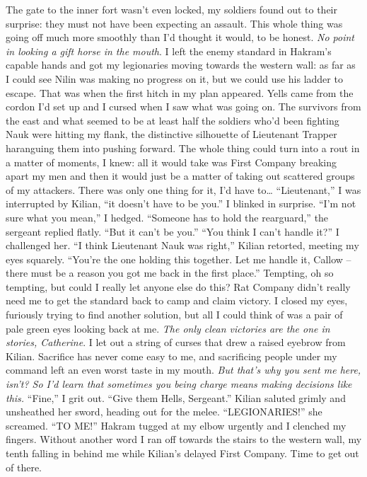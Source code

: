 \documentclass[12pt, openany]{book}
\begin{document}
The gate to the inner fort wasn’t even locked, my soldiers found out to their surprise: they must not have been expecting an assault. This whole thing was going off much more smoothly than I’d thought it would, to be honest. \textit{No point in looking a gift horse in the mouth}. I left the enemy standard in Hakram’s capable hands and got my legionaries moving towards the western wall: as far as I could see Nilin was making no progress on it, but we could use his ladder to escape. That was when the first hitch in my plan appeared. Yells came from the cordon I’d set up and I cursed when I saw what was going on. The survivors from the east and what seemed to be at least half the soldiers who’d been fighting Nauk were hitting my flank, the distinctive silhouette of Lieutenant Trapper haranguing them into pushing forward. The whole thing could turn into a rout in a matter of moments, I knew: all it would take was First Company breaking apart my men and then it would just be a matter of taking out scattered groups of my attackers. There was only one thing for it, I’d have to…
“Lieutenant,” I was interrupted by Kilian, “it doesn’t have to be you.”
I blinked in surprise.
“I’m not sure what you mean,” I hedged.
“Someone has to hold the rearguard,” the sergeant replied flatly. “But it can’t be you.”
“You think I can’t handle it?” I challenged her.
“I think Lieutenant Nauk was right,” Kilian retorted, meeting my eyes squarely. “You’re the one holding this together. Let me handle it, Callow – there must be a reason you got me back in the first place.”
Tempting, oh so tempting, but could I really let anyone else do this? Rat Company didn’t really need me to get the standard back to camp and claim victory. I closed my eyes, furiously trying to find another solution, but all I could think of was a pair of pale green eyes looking back at me. \textit{The only clean victories are the one in stories, Catherine}. I let out a string of curses that drew a raised eyebrow from Kilian. Sacrifice has never come easy to me, and sacrificing people under my command left an even worst taste in my mouth. \textit{But that’s why you sent me here, isn’t? So I’d learn that sometimes you being charge means making decisions like this.}
“Fine,” I grit out. “Give them Hells, Sergeant.”
Kilian saluted grimly and unsheathed her sword, heading out for the melee.
“LEGIONARIES!” she screamed. “TO ME!”
Hakram tugged at my elbow urgently and I clenched my fingers. Without another word I ran off towards the stairs to the western wall, my tenth falling in behind me while Kilian’s delayed First Company. Time to get out of there.
\end{document}
